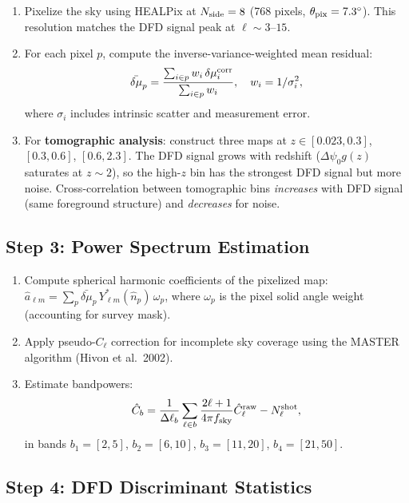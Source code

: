 \documentclass[11pt,a4paper]{article}
\newcounter{findingctr}
\newenvironment{finding}[1][]{%
  \refstepcounter{findingctr}%
  \begin{tcolorbox}[colback=blue!3!white, colframe=blue!50!black,
    title=\textbf{Finding \thefindingctr: #1}]
}{%
  \end{tcolorbox}%
}
\newcommand{\Dpsi}{\Delta\psi}
\begin{document}
\begin{finding}[\textbf{DECISIVE}: Complete Submission-Ready Test
  for Prediction~20]
\begin{enumerate}[nosep]
\item Pixelize the sky using HEALPix at $N_{\rm side} = 8$ (768 pixels,
  $\theta_{\rm pix} = 7.3^\circ$).  This resolution matches the
  DFD signal peak at $\ell \sim 3$--$15$.
\item For each pixel $p$, compute the inverse-variance-weighted mean
  residual:
  \begin{equation}
  \bar{\delta\mu}_p = \frac{\sum_{i \in p} w_i\,\delta\mu_i^{\rm corr}}
  {\sum_{i \in p} w_i}, \quad w_i = 1/\sigma_i^2,
  \end{equation}
  where $\sigma_i$ includes intrinsic scatter and measurement error.
\item For \textbf{tomographic analysis}: construct three maps at
  $z \in [0.023, 0.3]$, $[0.3, 0.6]$, $[0.6, 2.3]$.
  The DFD signal grows with redshift ($\Dpsi_0 g(z)$ saturates at
  $z \sim 2$), so the high-$z$ bin has the strongest DFD signal
  but more noise.  Cross-correlation between tomographic bins
  \emph{increases} with DFD signal (same foreground structure)
  and \emph{decreases} for noise.
\end{enumerate}

\subsection*{Step 3: Power Spectrum Estimation}

\begin{enumerate}[nosep]
\item Compute spherical harmonic coefficients of the pixelized map:
  $\hat{a}_{\ell m} = \sum_p \bar{\delta\mu}_p\,Y_{\ell m}^*(\hat{n}_p)
  \,\omega_p$, where $\omega_p$ is the pixel solid angle weight
  (accounting for survey mask).
\item Apply pseudo-$C_\ell$ correction for incomplete sky coverage
  using the MASTER algorithm (Hivon et al.\ 2002).
\item Estimate bandpowers:
  \begin{equation}
  \hat{C}_b = \frac{1}{\Delta\ell_b}\sum_{\ell \in b}
  \frac{2\ell+1}{4\pi f_{\rm sky}}\hat{C}_\ell^{\rm raw}
  - N_\ell^{\rm shot},
  \end{equation}
  in bands $b_1 = [2,5]$, $b_2 = [6,10]$, $b_3 = [11,20]$,
  $b_4 = [21,50]$.
\end{enumerate}

\subsection*{Step 4: DFD Discriminant Statistics}


\end{finding}
\end{document}
